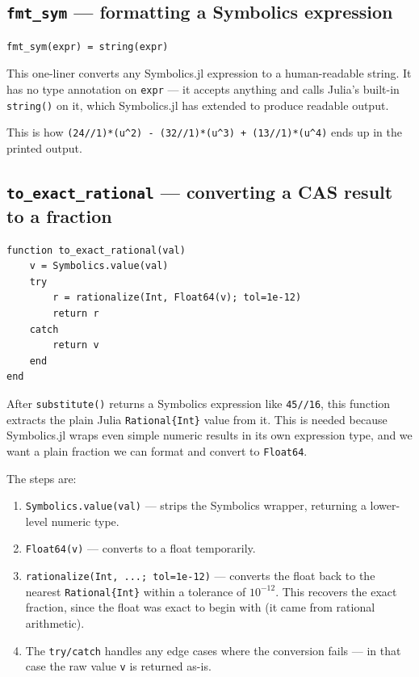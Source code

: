 \documentclass[12pt, a4paper]{article}
\newcommand{\cd}[1]{\texttt{#1}}
\begin{document}
\subsection{\texttt{fmt\_sym} --- formatting a Symbolics expression}

\begin{verbatim}
fmt_sym(expr) = string(expr)
\end{verbatim}

This one-liner converts any Symbolics.jl expression to a
human-readable string.
It has no type annotation on \cd{expr} ---
it accepts anything and calls Julia's built-in \cd{string()}
on it, which Symbolics.jl has extended to produce readable output.

This is how \cd{(24//1)*(u\^{}2) - (32//1)*(u\^{}3) + (13//1)*(u\^{}4)}
ends up in the printed output.

\subsection{\texttt{to\_exact\_rational} --- converting a CAS result to a fraction}

\begin{verbatim}
function to_exact_rational(val)
    v = Symbolics.value(val)
    try
        r = rationalize(Int, Float64(v); tol=1e-12)
        return r
    catch
        return v
    end
end
\end{verbatim}

After \cd{substitute()} returns a Symbolics expression like
\cd{45//16}, this function extracts the plain Julia
\cd{Rational\{Int\}} value from it.
This is needed because Symbolics.jl wraps even simple
numeric results in its own expression type, and we want
a plain fraction we can format and convert to \cd{Float64}.

The steps are:
\begin{enumerate}
  \item \cd{Symbolics.value(val)} --- strips the Symbolics wrapper,
        returning a lower-level numeric type.
  \item \cd{Float64(v)} --- converts to a float temporarily.
  \item \cd{rationalize(Int, ...; tol=1e-12)} --- converts the
        float back to the nearest \cd{Rational\{Int\}} within
        a tolerance of $10^{-12}$. This recovers the exact
        fraction, since the float was exact to begin with
        (it came from rational arithmetic).
  \item The \cd{try/catch} handles any edge cases where the
        conversion fails --- in that case the raw value \cd{v}
        is returned as-is.
\end{enumerate}
\end{document}
